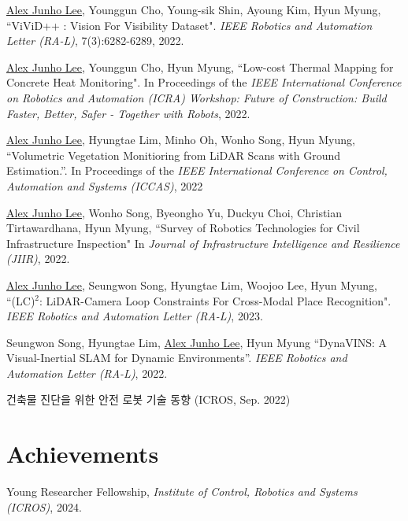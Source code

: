 \documentclass[margin]{res}
\begin{document}
\begin{resume}
		\par\underline{Alex Junho Lee}, Younggun Cho, Young-sik Shin, Ayoung Kim, Hyun Myung, ``ViViD++ : Vision For Visibility Dataset". \textit{IEEE Robotics and Automation Letter (RA-L)}, 7(3):6282-6289, 2022.
		
		\par\underline{Alex Junho Lee}, Younggun Cho, Hyun Myung, ``Low-cost Thermal Mapping for Concrete Heat Monitoring". In Proceedings of the \textit{IEEE International Conference on Robotics and Automation (ICRA) Workshop: Future of Construction: Build Faster, Better, Safer - Together with Robots}, 2022.
		
		\par\underline{Alex Junho Lee}, Hyungtae Lim, Minho Oh, Wonho Song, Hyun Myung, ``Volumetric Vegetation Monitioring from LiDAR Scans with Ground Estimation.''. In Proceedings of the \textit{IEEE International Conference on Control, Automation and Systems (ICCAS)}, 2022
		
		\par\underline{Alex Junho Lee}, Wonho Song, Byeongho Yu, Duckyu Choi, Christian Tirtawardhana, Hyun Myung, ``Survey of Robotics Technologies for Civil Infrastructure Inspection" In \textit{Journal of Infrastructure Intelligence and Resilience (JIIR)}, 2022.
		
		\par\underline{Alex Junho Lee}, Seungwon Song, Hyungtae Lim, Woojoo Lee, Hyun Myung, ``(LC)$^2$: LiDAR-Camera Loop Constraints
		For Cross-Modal Place Recognition". \textit{IEEE Robotics and Automation Letter (RA-L)}, 2023.
		
		\par Seungwon Song, Hyungtae Lim, \underline{Alex Junho Lee}, Hyun Myung ``DynaVINS: A Visual-Inertial SLAM for Dynamic Environments''.  \textit{IEEE Robotics and Automation Letter (RA-L)}, 2022.
		
		\par 건축물 진단을 위한 안전 로봇 기술 동향 (ICROS, Sep. 2022)
		
		\newpage
		\section{Achievements}
		
		\par Young Researcher Fellowship, \textit{Institute of Control, Robotics and Systems (ICROS)}, 2024.
		

\end{resume}
\end{document}
